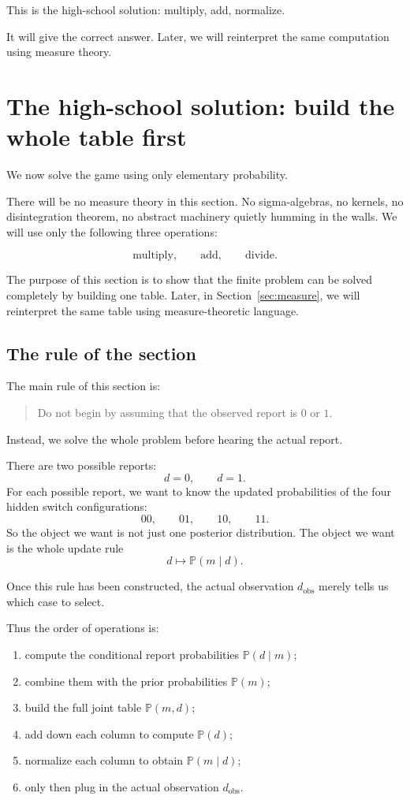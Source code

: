 \documentclass[11pt]{article}
\newcommand{\dobs}{d_{\mathrm{obs}}}
\begin{document}
This is the high-school solution: multiply, add, normalize.

It will give the correct answer. Later, we will reinterpret the same computation using measure theory.

\section{The high-school solution: build the whole table first}
\label{sec:elementary}

We now solve the game using only elementary probability.

There will be no measure theory in this section. No sigma-algebras, no kernels, no disintegration theorem, no abstract machinery quietly humming in the walls. We will use only the following three operations:

\[
    \text{multiply}, \qquad \text{add}, \qquad \text{divide}.
\]

The purpose of this section is to show that the finite problem can be solved completely by building one table. Later, in Section~\ref{sec:measure}, we will reinterpret the same table using measure-theoretic language.

\subsection{The rule of the section}

The main rule of this section is:

\begin{quote}
    Do not begin by assuming that the observed report is \(0\) or \(1\).
\end{quote}

Instead, we solve the whole problem before hearing the actual report.

There are two possible reports:
\[
    d=0,
    \qquad
    d=1.
\]
For each possible report, we want to know the updated probabilities of the four hidden switch configurations:
\[
    00,\qquad 01,\qquad 10,\qquad 11.
\]
So the object we want is not just one posterior distribution. The object we want is the whole update rule
\[
    d \longmapsto \mathbb{P}(m\mid d).
\]

Once this rule has been constructed, the actual observation \(\dobs\) merely tells us which case to select.

Thus the order of operations is:

\begin{enumerate}[leftmargin=*]
    \item compute the conditional report probabilities \(\mathbb{P}(d\mid m)\);
    \item combine them with the prior probabilities \(\mathbb{P}(m)\);
    \item build the full joint table \(\mathbb{P}(m,d)\);
    \item add down each column to compute \(\mathbb{P}(d)\);
    \item normalize each column to obtain \(\mathbb{P}(m\mid d)\);
    \item only then plug in the actual observation \(\dobs\).
\end{enumerate}
\end{document}
